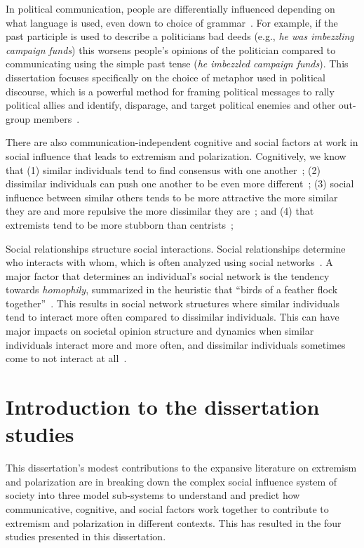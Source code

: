 In political communication, people are differentially
influenced depending on what language is used, even down to choice of 
grammar~\cite{Matlock2012}. For example, if the past participle is used
to describe a politicians bad deeds (e.g., \emph{he was imbezzling campaign
funds}) this worsens people's opinions of the politician compared to 
communicating using the simple past tense (\emph{he imbezzled campaign funds}).
This dissertation focuses specifically on the choice of metaphor used 
in political discourse, which is a powerful method for framing political 
messages to rally political allies and identify, disparage, and target
political enemies and other out-group members~\cite{OBrien2003,Charteris-Black2009,Landau2010}.

There are also communication-independent cognitive and social factors at work
in social influence that leads to extremism and polarization. Cognitively,
we know that (1) similar individuals tend to find consensus with one another~\cite{French1956,DeGroot1974};
(2) dissimilar individuals can push one another to be even more 
different~\cite{Cikara2014,Bail2018};
(3) social influence between similar others tends to be more attractive the more
similar they are and more repulsive the more dissimilar they are~\cite{Lord1979,Ross2012};
and (4) that extremists tend to be more stubborn than centrists~\cite{Reiss2019,Zmigrod2019a};

Social relationships structure social interactions. Social relationships
determine who interacts with whom, which is often analyzed using social
networks~\cite{Watts1999}. A major factor that determines an individual's social
network is the tendency towards \emph{homophily}, summarized in the heuristic
that ``birds of a feather flock together''~\cite{McPherson2001}. This results
in social network structures where similar individuals tend to interact more
often compared to dissimilar individuals. This can have major impacts on 
societal opinion structure and dynamics when similar individuals interact more
and more often, and dissimilar individuals sometimes come to not interact at
all~\cite{Axelrod1997,Centola2007,DellaPosta2015}.

\section{Introduction to the dissertation studies}

This dissertation's modest contributions to the expansive literature on extremism
and polarization are in breaking down the complex social influence system of
society into three model sub-systems to understand and predict how communicative,
cognitive, and social factors work together to contribute to extremism and polarization
in different contexts. This has resulted in the four studies presented in this dissertation.


